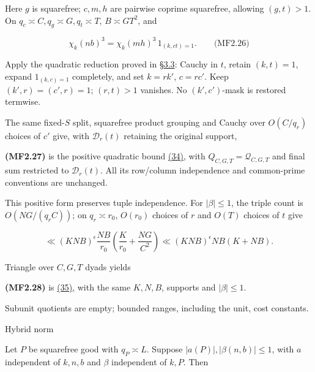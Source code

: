 Here \(g\) is squarefree; \(c,m,h\) are pairwise coprime squarefree, allowing \((g,t)>1\). On \(q_c\asymp C,q_g\asymp G,q_t\asymp T\), \(B\asymp GT^2\), and

\hypertarget{mf:eq:B2.26}{}

\label{mf:eq:B2.26}

\[
\chi_k(nb)^3=\chi_k(mh)^3\,1_{(k,ct)=1}.
\qquad\text{(MF2.26)}
\]

Apply the quadratic reduction proved in §\protect\hyperlink{cf:sec:B.3}{3.3}: Cauchy in \(t\), retain \((k,t)=1\), expand \(1_{(k,c)=1}\) completely, and set \(k=rk'\), \(c=rc'\). Keep \((k',r)=(c',r)=1\); \((r,t)>1\) vanishes. No \((k',c')\)-mask is restored termwise.

The same fixed-\(S\) split, squarefree product grouping and Cauchy over \(O(C/q_r)\) choices of \(c'\) give, with \(\mathcal D_r(t)\) retaining the original support,

\hypertarget{mf:eq:B2.27}{}

\label{mf:eq:B2.27}

\textbf{(MF2.27)} is the positive quadratic bound \protect\hyperlink{cf:eq:B.17}{(34)}, with \(Q_{C,G,T}=\mathcal Q_{C,G,T}\) and final sum restricted to \(\mathcal D_r(t)\). All its row/column independence and common-prime conventions are unchanged.

This positive form preserves tuple independence. For \(|\beta|\le1\), the triple count is \(O(NG/(q_rC))\); on \(q_r\asymp r_0\), \(O(r_0)\) choices of \(r\) and \(O(T)\) choices of \(t\) give

\[
\ll (KNB)^\epsilon\frac{NB}{r_0}
\left(\frac K{r_0}+\frac{NG}{C^2}\right)
\ll(KNB)^\epsilon NB(K+NB).
\]

Triangle over \(C,G,T\) dyads yields

\hypertarget{mf:eq:B2.28}{}

\label{mf:eq:B2.28}

\textbf{(MF2.28)} is \protect\hyperlink{cf:eq:B.18}{(35)}, with the same \(K,N,B\), supports and \(|\beta|\le1\).

Subunit quotients are empty; bounded ranges, including the unit, cost constants.

\hypertarget{hybrid-norm}{}

\label{hybrid-norm}

Hybrid norm

Let \(P\) be squarefree good with \(q_P\asymp L\). Suppose \(|a(P)|,|\beta(n,b)|\le1\), with \(a\) independent of \(k,n,b\) and \(\beta\) independent of \(k,P\). Then

